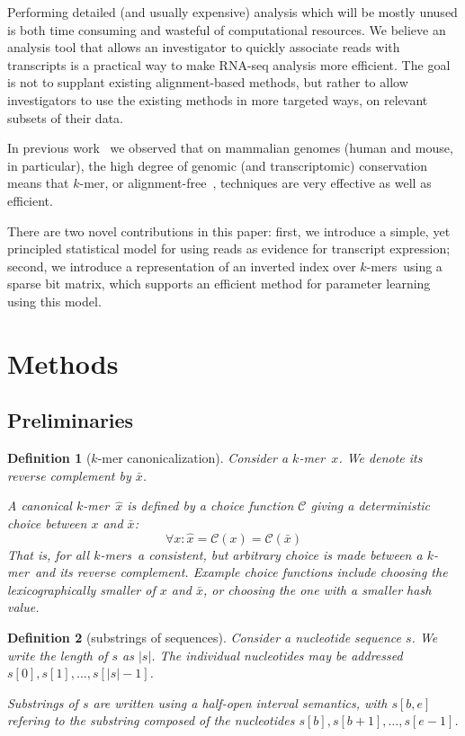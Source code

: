 \documentclass{bioinfo}
\newcommand{\kmer}{$k$-mer{}}
\newcommand{\kmers}{$k$-mers{}}
\newtheorem{defn}{Definition}
\begin{document}
Performing detailed (and usually expensive) analysis which will be mostly
unused is both time consuming and wasteful of computational resources.
We believe an analysis tool that allows an investigator to quickly associate
reads with transcripts is a practical way to make RNA-seq analysis more
efficient.
The goal is not to supplant existing alignment-based methods, but rather
to allow investigators to use the existing methods in more targeted ways,
on relevant subsets of their data.

In previous work~\citep{Xenome:2012} we observed that on mammalian genomes
(human and mouse, in particular), the high degree of genomic (and
transcriptomic) conservation means that \kmer{}, or
alignment-free~\citep{Vinga:2003}, techniques are very effective
as well as efficient.

There are two novel contributions in this paper:
first, we introduce a simple, yet principled statistical model for using reads
as evidence for transcript expression;
second, we introduce a representation of an inverted index
over \kmers\ using a sparse bit matrix, which supports an efficient
method for parameter learning using this model.

\section{Methods}

\subsection{Preliminaries}

\begin{defn}[\kmer{} canonicalization]

Consider a \kmer~$x$. We denote its reverse complement by $\bar{x}$.

A \textit{canonical \kmer{}}~$\hat{x}$ is defined by a choice function $\mathcal{C}$
giving a deterministic choice between $x$ and $\bar{x}$:
$$
    \forall x: \hat{x} = \mathcal{C}(x) = \mathcal{C}(\bar{x})
$$
That is, for all \kmers\ a consistent,
but arbitrary choice is made between a \kmer\ and its reverse complement.
Example choice functions include choosing the lexicographically smaller of $x$ and $\bar{x}$,
or choosing the one with a smaller hash value.
\end{defn}

\begin{defn}[substrings of sequences]
Consider a nucleotide sequence $s$.
We write the length of $s$ as $|s|$.
The individual nucleotides may be addressed $s[0], s[1], \ldots, s[|s| - 1]$.

Substrings of $s$ are written using a half-open interval semantics, with $s[b,e]$
refering to the substring composed of the nucleotides $s[b], s[b+1], \ldots, s[e - 1]$.
\end{defn}
\end{document}
